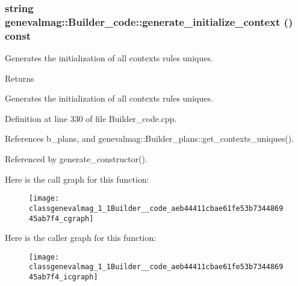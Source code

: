 \hypertarget{classgenevalmag_1_1Builder__code_aeb44411cbae61fe53b734486945ab7f4}{
\subsubsection[{generate\_\-initialize\_\-context}]{\setlength{\rightskip}{0pt plus 5cm}string genevalmag::Builder\_\-code::generate\_\-initialize\_\-context () const}}
\label{classgenevalmag_1_1Builder__code_aeb44411cbae61fe53b734486945ab7f4}
Generates the initialization of all contexts rules uniques. \begin{DoxyReturn}{Returns}

\end{DoxyReturn}
Generates the initialization of all contexts rules uniques. 

Definition at line 330 of file Builder\_\-code.cpp.



References b\_\-plans, and genevalmag::Builder\_\-plans::get\_\-contexts\_\-uniques().



Referenced by generate\_\-constructor().



Here is the call graph for this function:\nopagebreak
\begin{figure}[H]
\begin{center}
\leavevmode
\texttt{[image: classgenevalmag\_1\_1Builder\_\_code\_aeb44411cbae61fe53b734486945ab7f4\_cgraph]}
\end{center}
\end{figure}




Here is the caller graph for this function:\nopagebreak
\begin{figure}[H]
\begin{center}
\leavevmode
\texttt{[image: classgenevalmag\_1\_1Builder\_\_code\_aeb44411cbae61fe53b734486945ab7f4\_icgraph]}
\end{center}
\end{figure}


